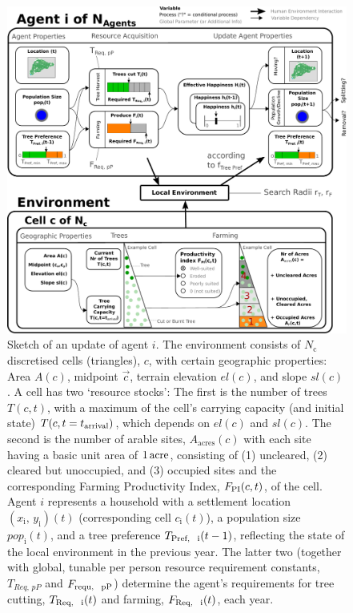 \begin{figure}[H]
	\centering
	\includegraphics[width=1.\textwidth, center]{images/SketchABM2/sketch_triangles.pdf}
	\caption{
		Sketch of an update of agent $i$.
		The environment consists of $N_\text{c}$ discretised cells (triangles), $c$, with certain geographic properties: Area $A(c)$, midpoint $\vec{c}$, terrain elevation $el(c)$, and slope $sl(c)$.  %
		A cell has two `resource stocks':
		The first is the number of trees $T(c,t)$, with a maximum of the cell's carrying capacity (and initial state) $T(c,t=t_{\rm arrival})$, which depends on $el(c)$ and $sl(c)$. 
		The second is the number of arable sites, $A_\text{acres}(c)$ with each site having a basic unit area of $1\, {\rm acre}$, consisting of (1) uncleared, (2) cleared but unoccupied, and (3) occupied sites and the corresponding Farming Productivity Index, $F_{\rm PI}(c,t)$, of the cell.
		Agent $i$ represents a household with a settlement location $(x_\text{i},\, y_\text{i})(t)$ (corresponding cell $c_\text{i}(t)$), a population size $pop_\text{i}(t)$, and a tree preference $T_\text{Pref, \, i}(t-1)$, reflecting the state of the local environment in the previous year. The latter two (together with global, tunable per person resource requirement constants, $T_{Req, \, pP}$ and  $F_\text{requ, \, pP}$) determine the agent's requirements for tree cutting, $T_\text{Req, \, i}(t)$ and farming, $F_\text{Req, \, i}(t)$, each year.
}
\end{figure}
